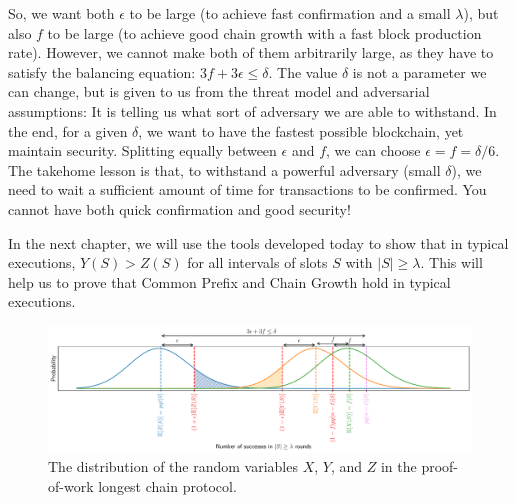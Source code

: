 So, we want both  $\epsilon$ to be large (to achieve fast confirmation and a small $\lambda$), but also $f$ to be large (to achieve good chain growth with a fast block production rate). However, we cannot make both of them arbitrarily large, as they have to satisfy the balancing equation: $3f + 3\epsilon \leq \delta$. The value $\delta$ is not a parameter we can change, but is given to us from the threat model and adversarial assumptions: It is telling us what sort of adversary we are able to withstand. In the end, for a given $\delta$, we want to have the fastest possible blockchain, yet maintain security. Splitting equally between $\epsilon$ and $f$, we can choose $\epsilon = f = \delta/6$. The takehome lesson is that, to withstand a powerful adversary (small $\delta$), we need to wait a sufficient amount of time for transactions to be confirmed. You cannot have both quick confirmation and good security!

In the next chapter, we will use the tools developed today to show that in typical executions, $Y(S) > Z(S)$ for all intervals of slots $S$ with $|S|\geq \lambda$. This will help us to prove that Common Prefix and Chain Growth hold in typical executions.

\begin{landscape}\centering
\begin{figure}
    \centering
    \vspace*{\fill}
    \includegraphics[width=\linewidth]{figures/backbone-vars.pdf}
    \caption{The distribution of the random variables $X$, $Y$, and $Z$ in the proof-of-work longest chain protocol.}
    \label{fig:balancing_eq}
    \vspace*{\fill}
\end{figure}
\end{landscape}


